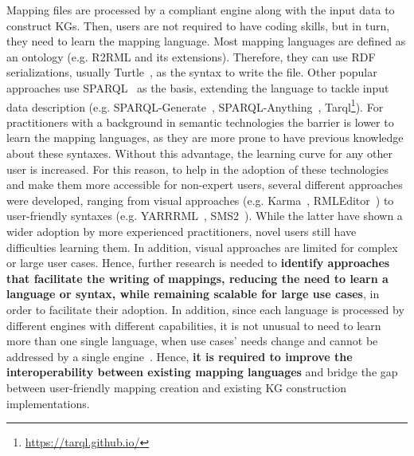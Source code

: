 

Mapping files are processed by a compliant engine along with the input data to construct KGs. 
Then, users are not required to have coding skills, but in turn, they need to learn the mapping language. 
Most mapping languages are defined as an ontology (e.g. R2RML and its extensions). 
Therefore, they can use RDF serializations, usually Turtle~\parencite{turtle}, as the syntax to write the file.
Other popular approaches use SPARQL~\parencite{harris2013sparql} as the basis, extending the language to tackle input data description (e.g. SPARQL-Generate~\parencite{Lefrancois2017sparqlgenerate}, SPARQL-Anything~\parencite{asprino2023sparql-anything}, Tarql\footnote{\url{https://tarql.github.io/}}). 
For practitioners with a background in semantic technologies the barrier is lower to learn the mapping languages, as they are more prone to have previous knowledge about these syntaxes. 
Without this advantage, the learning curve for any other user is increased. 
For this reason, to help in the adoption of these technologies and make them more accessible for non-expert users, several different approaches were developed, ranging from visual approaches (e.g. Karma~\parencite{gupta2012karma}, RMLEditor~\parencite{heyvaert2016rmleditor}) to user-friendly syntaxes (e.g. YARRRML~\parencite{Heyvaert2018yarrrml}, SMS2~\parencite{sms2}). 
While the latter have shown a wider adoption by more experienced practitioners, novel users still have difficulties learning them. 
In addition, visual approaches are limited for complex or large user cases. 
Hence, further research is needed to \textbf{identify approaches that facilitate the writing of mappings, reducing the need to learn a language or syntax, while remaining scalable for large use cases}, in order to facilitate their adoption. 
In addition, since each language is processed by different engines with different capabilities, it is not unusual to need to learn more than one single language, when use cases' needs change and cannot be addressed by a single engine~\parencite{corcho2020towards}. 
Hence, \textbf{it is required to improve the interoperability between existing mapping languages} and bridge the gap between user-friendly mapping creation and existing KG construction implementations. 


